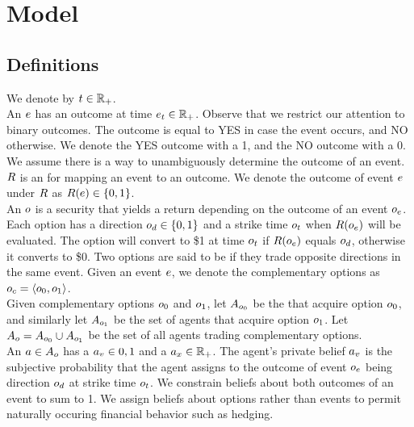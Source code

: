 \section{Model}

\subsection{Definitions}

We denote  by $t\in\mathbb{R}_+$. \\

An  $e$ has an outcome at time $e_t \in \mathbb{R}_+$. 
Observe that we restrict our attention to binary outcomes. 
The outcome is equal to YES in case the event occurs, and NO otherwise. 
We denote the YES outcome with a 1, and the NO outcome with a 0.
We assume there is a way to unambiguously determine the outcome of an event. \\

$R$ is an  for mapping an event to an outcome.
We denote the outcome of event $e$ under $R$ as 
$R(e) \in \{0,1\}$.\\

An  $o$ is a security that yields a return depending on 
the outcome of an event $o_e$. Each option has a direction 
$o_d \in \{0, 1\}$ and a strike time $o_t$ 
when $R(o_e)$ will be evaluated. 
The option will convert to \$1 at time $o_t$ if $R(o_e)$ equals 
$o_d$, otherwise it converts to \$0. Two options are said to be
 if they trade opposite directions in the same event. Given an
event $e$, we denote the complementary options as 
$o_c = \left<o_{0}, o_{1}\right>$.\\

Given complementary options $o_{0}$ and $o_{1}$,
let $A_{o_0}$ be the  that acquire option
$o_{0}$, and similarly let $A_{o_1}$ be the set 
of agents that acquire option $o_{1}$. 
Let $A_o = A_{o_0} \cup A_{o_1}$
be the set of all agents trading complementary options.\\

An  $a\in A_o$ has a  
$a_v \in {0,1}$ 
and a  $a_x \in \mathbb{R}_+$.
The agent's private belief $a_v$ 
is the subjective probability that the agent
assigns to the outcome of event $o_e$ being direction $o_d$
at strike time $o_t$. We constrain beliefs about both outcomes of an event to sum to 1. We assign beliefs about options rather than events to permit naturally occuring financial behavior such as hedging.\\

